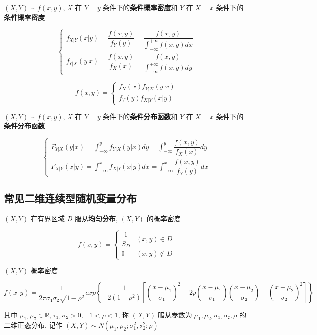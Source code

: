 \begin{definition}[条件分布函数和条件概率密度]

	$(X,Y)\sim f(x,y)$, $X$ 在 $Y = y$ 条件下的\textbf{条件概率密度}和 $Y$ 在 $X = x$ 条件下的\textbf{条件概率密度}
	
	$$\begin{cases}
		f_{X\big|Y}(x\big|y) = \dfrac{f(x,y)}{f_{Y}(y)} = \dfrac{f(x,y)}{\int_{-\infty}^{+\infty}f(x,y)dx}\\
		f_{Y\big|X}(y\big|x) = \dfrac{f(x,y)}{f_{X}(x)} = \dfrac{f(x,y)}{\int_{-\infty}^{+\infty}f(x,y)dy}
	\end{cases}$$

	$$f(x,y) = 
	\begin{cases}
		f_{X}(x)f_{Y\big|X}(y\big|x) \\
		f_{Y}(y)f_{X\big|Y}(x\big|y) 
	\end{cases}$$
	
	$(X,Y)\sim f(x,y)$, $X$ 在 $Y = y$ 条件下的\textbf{条件分布函数}和 $Y$ 在 $X = x$ 条件下的\textbf{条件分布函数}

	$$\begin{cases}
		F_{Y\big|X}(y\big|x) = \int_{-\infty}^{y}f_{Y\big|X}(y\big|x)dy = \int_{-\infty}^{y}\dfrac{f(x,y)}{f_{X}(x)}dy\\
		F_{X\big|Y}(x\big|y) = \int_{-\infty}^{x}f_{X\big|Y}(x\big|y)dx = \int_{-\infty}^{x}\dfrac{f(x,y)}{f_{Y}(y)}dx
	\end{cases}$$
\end{definition}

\subsection{常见二维连续型随机变量分布}

\begin{definition}[二维均匀分布]
	$(X,Y)$ 在有界区域 $D$ 服从\textbf{均匀分布}, $(X,Y)$ 的概率密度 
	
	$$f(x,y) = 
	\begin{cases}
		\dfrac{1}{S_{D}} & (x,y)\in D\\
		0 & (x,y)\notin D
	\end{cases}$$
\end{definition}

\begin{definition}[二维正态分布]
	$(X,Y)$ 概率密度

	$$f(x,y) = \dfrac{1}{2\pi\sigma_{1}\sigma_{2}\sqrt{1-\rho^2}}exp\left\{-\dfrac{1}{2(1-\rho^2)}\left[ \left( \dfrac{x-\mu_{1}}{\sigma_{1}}\right)^2-2\rho\left( \dfrac{x-\mu_{1}}{\sigma_{1}}\right)\left( \dfrac{x-\mu_{2}}{\sigma_{2}}\right) +\left( \dfrac{x-\mu_{2}}{\sigma_{2}}\right)^2\right] \right\} $$
	
	其中 $\mu_{1},\mu_{2}\in\mathbb{R}, \sigma_{1},\sigma_{2} > 0, -1 < \rho <1$, 称 $(X,Y)$ 服从参数为 $\mu_{1},\mu_{2},\sigma_{1},\sigma_{2},\rho$ 的二维正态分布,
	记作 $(X,Y)\sim N(\mu_{1},\mu_{2};\sigma_{1}^2,\sigma_{2}^2;\rho)$
\end{definition}

